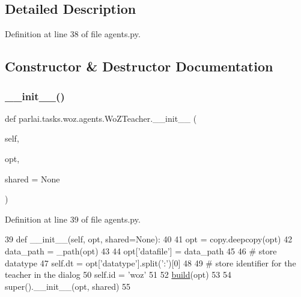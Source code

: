 \subsection{Detailed Description}


Definition at line 38 of file agents.\+py.



\subsection{Constructor \& Destructor Documentation}
\mbox{\label{classparlai_1_1tasks_1_1woz_1_1agents_1_1WoZTeacher_a7551f5329374f3a7adcaf1c7026db79f}} 
\subsubsection{\texorpdfstring{\+\_\+\+\_\+init\+\_\+\+\_\+()}{\_\_init\_\_()}}
{\footnotesize\ttfamily def parlai.\+tasks.\+woz.\+agents.\+Wo\+Z\+Teacher.\+\_\+\+\_\+init\+\_\+\+\_\+ (\begin{DoxyParamCaption}\item[{}]{self,  }\item[{}]{opt,  }\item[{}]{shared = {\ttfamily None} }\end{DoxyParamCaption})}



Definition at line 39 of file agents.\+py.


\begin{DoxyCode}
39     \textcolor{keyword}{def }\_\_init\_\_(self, opt, shared=None):
40 
41         opt = copy.deepcopy(opt)
42         data\_path = \_path(opt)
43 
44         opt[\textcolor{stringliteral}{'datafile'}] = data\_path
45 
46         \textcolor{comment}{# store datatype}
47         self.dt = opt[\textcolor{stringliteral}{'datatype'}].split(\textcolor{stringliteral}{':'})[0]
48 
49         \textcolor{comment}{# store identifier for the teacher in the dialog}
50         self.id = \textcolor{stringliteral}{'woz'}
51 
52         \hyperlink{namespaceparlai_1_1mturk_1_1tasks_1_1talkthewalk_1_1download_a8c0fbb9b6dfe127cb8c1bd6e7c4e33fd}{build}(opt)
53 
54         super().\_\_init\_\_(opt, shared)
55 
\end{DoxyCode}


